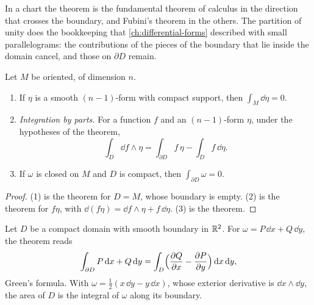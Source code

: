 \begin{notechapter}
\begin{intuition}
In a chart the theorem is the fundamental theorem of calculus in the
direction that crosses the boundary, and Fubini's theorem in the
others. The partition of unity does the bookkeeping that
\cref{ch:differential-forms} described with small parallelograms: the
contributions of the pieces of the boundary that lie inside the domain
cancel, and those on $\partial D$ remain.
\end{intuition}

\begin{corollary}\label{stokes:cor:consequences}
Let $M$ be oriented, of dimension $n$.
\begin{enumerate}[nosep]
  \item If $\eta$ is a smooth $(n - 1)$-form with compact support, then
        $\int_M\dd\eta = 0$.
  \item \emph{Integration by parts.} For a function $f$ and an
        $(n - 1)$-form $\eta$, under the hypotheses of the theorem,
        \[
          \int_D\dd f\wedge\eta
          = \int_{\partial D}f\,\eta - \int_Df\,\dd\eta .
        \]
  \item If $\omega$ is closed on $M$ and $D$ is compact, then
        $\int_{\partial D}\omega = 0$.
\end{enumerate}
\end{corollary}

\begin{proof}
(1) is the theorem for $D = M$, whose boundary is empty. (2) is the
theorem for $f\eta$, with
$\dd(f\eta) = \dd f\wedge\eta + f\,\dd\eta$. (3) is the theorem.
\end{proof}

\begin{example}\label{stokes:ex:green}
Let $D$ be a compact domain with smooth boundary in $\mathbb{R}^2$. For
$\omega = P\,\dd x + Q\,\dd y$, the theorem reads
\[
  \int_{\partial D}P\,\mathrm{d} x + Q\,\mathrm{d} y
  = \int_D\Bigl(\frac{\partial Q}{\partial x}
    - \frac{\partial P}{\partial y}\Bigr)\,\mathrm{d} x\,\mathrm{d} y ,
\]
Green's formula. With $\omega = \frac12(x\,\dd y - y\,\dd x)$, whose
exterior derivative is $\dd x\wedge\dd y$, the area of $D$ is the
integral of $\omega$ along its boundary.
\end{example}


\end{notechapter}
